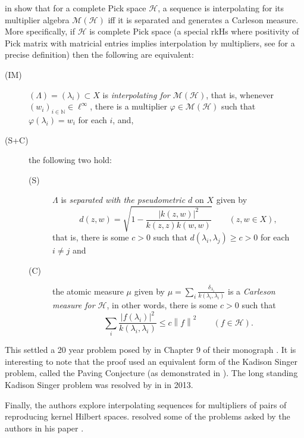 \documentclass[12pt]{amsart}
\theoremstyle{definition}
\numberwithin{equation}{section}
\theoremstyle{remark}
\theoremstyle{plain}
\newcommand{\N}{\mathbb N}
\newcommand{\calH}{{\mathcal H}}
\newcommand{\calM}{{\mathcal M}}
\newcommand{\norm}[1]{\left\lVert #1 \right\rVert}
\newcommand{\abs}[1]{\left\lvert #1 \right\rvert}
\begin{document}
\citeauthor{zbMATH07130838} in \cite{zbMATH07130838} show that for a complete Pick space $\calH$, a sequence is interpolating for its multiplier algebra $\calM \left( \calH \right)$ iff it is separated and generates a Carleson measure. More specifically, if $\calH$ is complete Pick space (a special rkHs where positivity of Pick matrix with matricial entries implies interpolation by multipliers, see \cite{MR1882259} for a precise definition) then the following are equivalent:
\begin{description}
\item[(IM)] $\left( \Lambda \right) = \left( \lambda_{i} \right) \subset X$ is \textit{interpolating for $\calM \left( \calH \right)$}, that is, whenever $\left( w_{i} \right)_{i \in \N} \in \ell ^{\infty}$, there is a multiplier $\varphi \in \calM \left( \calH \right)$ such that $\varphi \left( \lambda_{i} \right) = w_{i}$ for each $i$, and,
\item[(S+C)] the following two hold:
\begin{description}
\item[(S)] $\Lambda$ is \textit{separated with the pseudometric $d$} on $X$ given by
\begin{equation*}
d\left( z,w \right) = \sqrt{1- \frac{\abs{k\left( z,w \right)}^{2}}{k\left( z,z \right)k\left( w,w \right)}}  \qquad (z,w \in X) ,
\end{equation*}
that is, there is some $c> 0$ such that $d\left( \lambda_{i}, \lambda_{j} \right) \ge c > 0$ for each $i\ne j$ and
\item[(C)] the atomic measure $\mu$ given by $\displaystyle \mu = \sum_{i}\frac{\delta_{\lambda_{i}}}{k\left( \lambda_{i}, \lambda_{i} \right)}$ is a \textit{Carleson measure for $\calH$}, in other words, there is some $c> 0$ such that 
\begin{equation*}
\sum_{i} \frac{\abs{f\left( \lambda_{i} \right)}^{2}}{k\left( \lambda_{i}, \lambda_{i} \right)} \le c \norm{f}^{2} \qquad \left( f\in \calH \right).
\end{equation*}
\end{description}
\end{description}

This settled a 20 year problem posed by \citeauthor{MR1882259} in Chapter 9 of their monograph  \cite{MR1882259}. It is interesting to note that the proof used an equivalent form of the Kadison Singer problem, called the Paving Conjecture (as demonstrated in \cite{33675660-3119-37a8-a5d2-fa5a40dfb227}). The long standing Kadison Singer problem was resolved by \citeauthor{MR3374963} in \cite{MR3374963} in 2013. 

Finally, the authors explore interpolating sequences for multipliers of pairs of reproducing kernel Hilbert spaces. \citeauthor{zbMATH07704844} resolved some of the problems asked by the authors in his paper \cite{zbMATH07704844}.
\nocite{*}
\printbibliography
\end{document}
